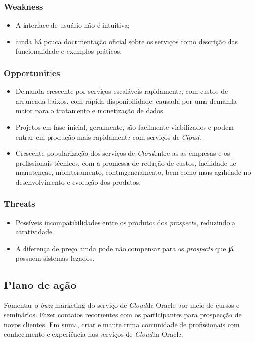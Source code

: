 \documentclass[a4paper]{article}
\newcommand{\C}{\emph{Cloud}}
\begin{document}
\subsubsection{Weakness}

\begin{itemize}
\item A interface de usuário não é intuitiva;
\item ainda há pouca documentação oficial sobre os serviços como descrição das funcionalidade e exemplos práticos. 
\end{itemize}

\subsubsection{Opportunities}

\begin{itemize}
\item Demanda crescente por serviços escaláveis rapidamente, com custos de arrancada baixos, com rápida disponibilidade, causada por uma demanda maior para o tratamento e monetização de dados. 
\item Projetos em fase inicial, geralmente, são facilmente viabilizados e podem entrar em produção mais rapidamente com serviços de \C. 
\item Crescente popularização dos serviços de \C entre as as empresas e os profissionais técnicos, com a promessa de redução de custos, facilidade de manutenção, monitoramento, contingenciamento, bem como mais agilidade no desenvolvimento e evolução dos produtos.
\end{itemize}
\subsubsection{Threats}

\begin{itemize}
\item Possíveis incompatibilidades entre os produtos dos \emph{prospects}, reduzindo a atratividade.
\item A diferença de preço ainda pode não compensar para os \emph{prospects} que já possuem sistemas legados.
\end{itemize}

\subsection{Plano de ação}

Fomentar o \emph{buzz} marketing do serviço de \C da Oracle por meio de cursos e seminários. Fazer contatos recorrentes com os participantes para prospecção de novos clientes. Em suma, criar e mante ruma comunidade de profissionais com conhecimento e experiência nos serviços de \C da Oracle.
\end{document}
